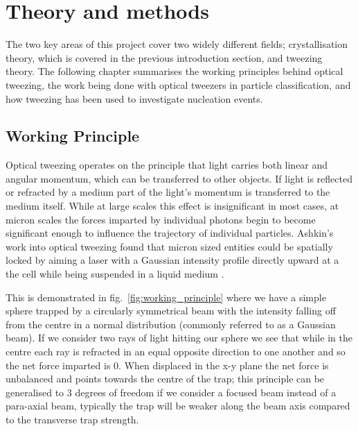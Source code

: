 \chapter{Theory and methods}
\label{chapter:theory}
The two key areas of this project cover two widely different fields; 
crystallisation theory, which is covered in the previous introduction 
section, and tweezing theory. The following chapter summarises the 
working principles behind optical tweezing, the work being done with 
optical tweezers in particle classification, and how tweezing has been 
used to investigate nucleation events. 

\section{Working Principle}

Optical tweezing operates on the principle that light carries both
linear and angular momentum, which can be transferred to other
objects. If light is reflected or refracted by a medium part of the
light's momentum is transferred to the medium itself. While at large
scales this effect is insignificant in most cases, at micron scales
the forces imparted by individual photons begin to become significant
enough to influence the trajectory of individual particles. Ashkin's 
work into optical tweezing found that micron sized entities could be 
spatially locked by aiming a laser with a Gaussian intensity profile 
directly upward at a the cell while being suspended in a liquid medium 
\cite{Ashkin1970}. 

This is demonstrated in fig.~\ref{fig:working_principle} where we have 
a simple sphere trapped by a circularly symmetrical beam with the intensity
falling off from the centre in a normal distribution (commonly referred to
as a Gaussian beam). If we consider two rays of light hitting our sphere 
we see that while in the centre each ray is refracted in an equal opposite 
direction to one another and so the net force imparted is 0. When displaced 
in the x-y plane the net force is unbalanced and points towards the centre 
of the trap; this principle can be generalised to 3 degrees of freedom if we 
consider a focused beam instead of a para-axial beam, typically the trap will be
weaker along the beam axis compared to the transverse trap strength.


